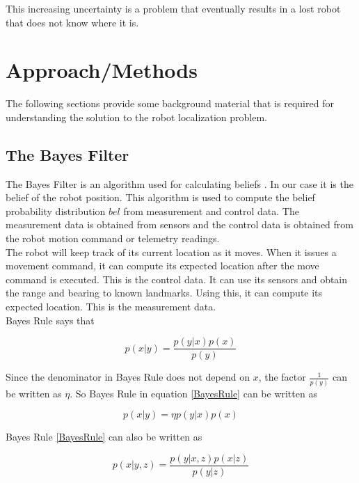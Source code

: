 \documentclass[conference]{IEEEtran}
\begin{document}
This increasing uncertainty is a problem that eventually results in a lost robot that does not know where it is.

\section{Approach/Methods}

The following sections provide some background material that is required for understanding the solution to the robot localization problem.

\subsection{The Bayes Filter}

The Bayes Filter is an algorithm used for calculating beliefs \cite{thrun}. In our case it is the belief of the robot position. This algorithm is used to compute the belief probability distribution $bel$ from measurement and control data. The measurement data is obtained from sensors and the control data is obtained from the robot motion command or telemetry readings.\\

The robot will keep track of its current location as it moves. When it issues a movement command, it can compute its expected location after the move command is executed. This is the control data. It can use its sensors and obtain the range and bearing to known landmarks. Using this, it can compute its expected location. This is the measurement data.\\

Bayes Rule says that

\begin{equation}\label{BayesRule}
p(x|y) = \frac{p(y|x) p(x)}{p(y)}
\end{equation}

Since the denominator in Bayes Rule does not depend on $x$, the factor $\frac{1}{p(y)}$ can be written as $\eta$. So Bayes Rule in equation \ref{BayesRule} can be written as

\begin{equation}\label{BayesRuleEta}
p(x|y) = \eta p(y|x) p(x)
\end{equation}

Bayes Rule \ref{BayesRule} can also be written as 

\begin{equation}\label{BayesRuleCondZ}
p(x|y,z) = \frac{p(y|x,z) p(x|z)}{p(y|z)}
\end{equation}
\end{document}
